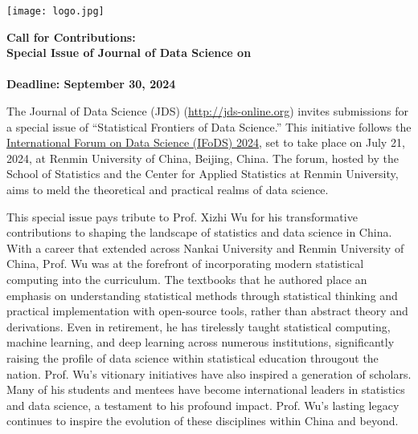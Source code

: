 \documentclass[12pt]{article}
\begin{document}
\pagestyle{empty}


\noindent
\begin{minipage}[m]{1.74in}
\texttt{[image: logo.jpg]}
\end{minipage}
\hfill
\begin{minipage}[m]{5in}
\begin{center}
  {\color{dukeblue}
    {\bf\LARGE Call for Contributions:}}\\[1ex]
  {\bf\large Special Issue of Journal of Data Science on}\\[1ex]
  {\color{dukeblue}{\bf\large  Statistical Frontiers of Data Science}\\[1ex]
  {\bf Deadline: September 30, 2024}}
\end{center}
\end{minipage}

\bigskip

The Journal of Data Science (JDS) (\url{http://jds-online.org})
invites submissions for a special issue of ``Statistical Frontiers of
Data Science.''  This initiative follows the
\href{https://statds.org/events/ifods2024}{International Forum on Data
  Science (IFoDS) 2024}, set to take place on July 21, 2024, at
Renmin University of China, Beijing, China. The forum, hosted by the
School of Statistics and the Center for Applied Statistics at Renmin
University, aims to meld the theoretical and practical realms of data
science.


This special issue pays tribute to Prof. Xizhi Wu for his
transformative contributions to shaping the landscape of statistics
and data science in China. With a career that extended across Nankai
University and Renmin University of China, Prof. Wu was at the
forefront of incorporating modern statistical computing into the
curriculum. The textbooks that he authored place an emphasis on
understanding statistical methods through statistical thinking and
practical implementation with open-source tools, rather than
abstract theory and derivations. Even in retirement, he has tirelessly
taught statistical computing, machine learning, and deep learning
across numerous institutions, significantly raising the profile of
data science within statistical education througout the nation.
Prof. Wu's vitionary initiatives have also inspired a generation of
scholars. Many of his students and mentees have become
international leaders in statistics and data science, a testament to
his profound impact. Prof. Wu's lasting legacy continues to inspire
the evolution of these disciplines within China and beyond.
\end{document}
